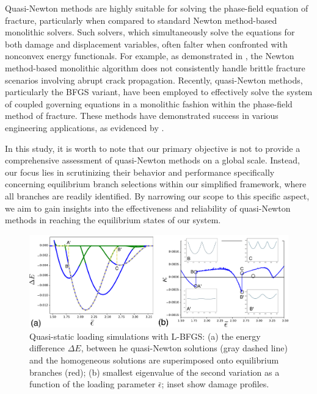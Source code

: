 Quasi-Newton methods are highly suitable for solving the phase-field equation of fracture, particularly when compared to standard Newton method-based monolithic solvers. Such solvers, which simultaneously  solve the equations for both damage and displacement variables, often falter when confronted with nonconvex energy functionals. For example, as demonstrated in \cite{Wick2017-bo}, the Newton method-based monolithic algorithm does not consistently handle brittle fracture scenarios involving abrupt crack propagation. Recently, quasi-Newton methods, particularly the BFGS variant, have been employed to effectively solve the system of coupled governing equations in a monolithic fashion within the phase-field method of fracture. These methods have demonstrated success in various engineering applications, as evidenced by \cite{Kristensen2020-zy,Wu2020-qk,Salman2021-mn,Liu2022-ix}.

In  this study, it is worth to note that our primary objective is not to provide a comprehensive assessment of quasi-Newton methods on a global scale. Instead, our focus lies in scrutinizing their behavior and performance specifically concerning equilibrium branch selections within our simplified framework, where all branches are readily identified. By narrowing our scope to this specific aspect, we aim to gain insights into the effectiveness and reliability of quasi-Newton methods in reaching the equilibrium states of our system.
\begin{figure}
\includegraphics[scale=0.13]{./final_images/fig4.pdf}
    \caption{
Quasi-static loading simulations with L-BFGS: (a) the energy difference $\Delta E$, between he quasi-Newton solutions (gray dashed line) and the homogeneous solutions are superimposed onto equilibrium branches (red); (b) smallest eigenvalue of the second variation  as a function of the loading parameter $\bar\epsilon$; inset show damage profiles.}
    \label{fig:tempo1}
\end{figure}

